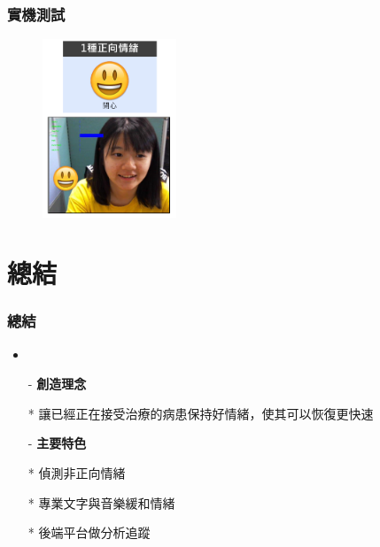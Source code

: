 \documentclass[10pt, conference, compsocconf]{beamer}
\begin{document}
\begin{CJK}{UTF8}{}
\begin{frame}
\end{frame}

\begin{frame}
\frametitle{實機測試}

\begin{figure}[t]
\begin{center}
\includegraphics[width=4cm]{./Figures/1Emotion.pdf}
\end{center}
\end{figure}


\end{frame}

\section{總結}

\begin{frame}
\frametitle{總結}
\begin{itemize}
\item{}
\end{itemize}
\begin{itemize}
\item[-] \Large\bf 創造理念
\end{itemize}
\begin{itemize}
\item[*] \large 讓已經正在接受治療的病患保持好情緒，使其可以恢復更快速
\end{itemize}
\begin{itemize}
\item[-] \Large\bf 主要特色
\end{itemize}
\begin{itemize}
\item[*] \large 偵測非正向情緒
\item[*] \large 專業文字與音樂緩和情緒
\item[*] \large 後端平台做分析追蹤
\end{itemize}
\end{frame}


\end{CJK}
\end{document}
